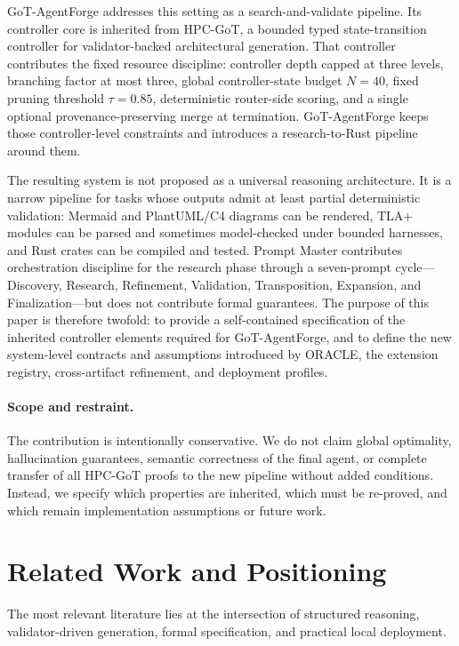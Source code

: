 \documentclass[11pt,a4paper,oneside]{article}
\begin{document}
GoT-AgentForge addresses this setting as a search-and-validate pipeline. Its controller core is inherited from HPC-GoT, a bounded typed state-transition controller for validator-backed architectural generation. That controller contributes the fixed resource discipline: controller depth capped at three levels, branching factor at most three, global controller-state budget $N=40$, fixed pruning threshold $\tau=0.85$, deterministic router-side scoring, and a single optional provenance-preserving merge at termination. GoT-AgentForge keeps those controller-level constraints and introduces a research-to-Rust pipeline around them.

The resulting system is not proposed as a universal reasoning architecture. It is a narrow pipeline for tasks whose outputs admit at least partial deterministic validation: Mermaid and PlantUML/C4 diagrams can be rendered, TLA+ modules can be parsed and sometimes model-checked under bounded harnesses, and Rust crates can be compiled and tested. Prompt Master contributes orchestration discipline for the research phase through a seven-prompt cycle---Discovery, Research, Refinement, Validation, Transposition, Expansion, and Finalization---but does not contribute formal guarantees. The purpose of this paper is therefore twofold: to provide a self-contained specification of the inherited controller elements required for GoT-AgentForge, and to define the new system-level contracts and assumptions introduced by ORACLE, the extension registry, cross-artifact refinement, and deployment profiles.

\paragraph{Scope and restraint.}
The contribution is intentionally conservative. We do not claim global optimality, hallucination guarantees, semantic correctness of the final agent, or complete transfer of all HPC-GoT proofs to the new pipeline without added conditions. Instead, we specify which properties are inherited, which must be re-proved, and which remain implementation assumptions or future work.

\section{Related Work and Positioning}
The most relevant literature lies at the intersection of structured reasoning, validator-driven generation, formal specification, and practical local deployment.
\end{document}
